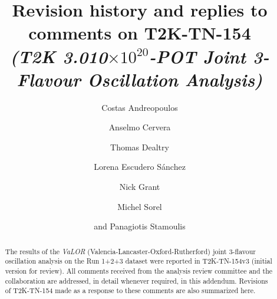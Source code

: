 %
%

\begin{frontmatter}

\title{
  Revision history and replies to comments on T2K-TN-154\\
  {\em(T2K 3.010$\times10^{20}$-POT Joint 3-Flavour Oscillation Analysis)}
}

\vspace*{0.7cm}

\author[RAL]     {Costas Andreopoulos}
\author[IFIC]    {Anselmo Cervera}
\author[RAL,OXF] {Thomas Dealtry}
\author[IFIC]    {Lorena Escudero S\'anchez}
\author[LANCS]   {Nick Grant}
\author[IFIC]    {Michel Sorel}
\author[IFIC]    {and Panagiotis Stamoulis}

\address[RAL]{Particle Physics Dept., Rutherford Appleton Laboratory, STFC \\
              Harwell Science and Innovation Campus\\
              Oxfordshire OX11 0QX, UK}
\address[OXF]{Subdepartment of Particle Physics, University of Oxford \\
              Denys Wilkinson Building, Keble Road\\
              Oxfordshire OX1 3RH, UK}
\address[LANCS]{Physics Dept., Lancaster University \\
              Lancaster, LA1 4YB, UK}
\address[IFIC]{Instituto de Fisica Corpuscular\\
              CSIC and University of Valencia\\
              Valencia, Spain}

%
%

\begin{abstract}

The results of the {\em VaLOR} (Valencia-Lancaster-Oxford-Rutherford) 
joint 3-flavour oscillation analysis on the Run 1+2+3 dataset 
were reported in T2K-TN-154v3 (initial version for review).
All comments received from the analysis review committee and the collaboration
are addressed, in detail whenever required, in this addendum.
Revisions of T2K-TN-154 made as a response to these comments 
are also summarized here.

\end{abstract}

\end{frontmatter}


\tableofcontents

\clearpage



